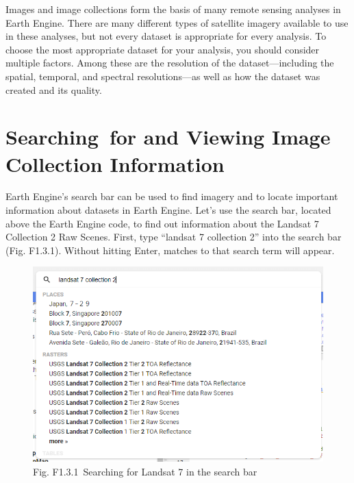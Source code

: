 \documentclass[
  letterpaper,
  DIV=11,
  numbers=noendperiod]{scrreprt}
\begin{document}

Images and image collections form the basis of many remote sensing
analyses in Earth Engine. There are many different types of satellite
imagery available to use in these analyses, but not every dataset is
appropriate for every analysis. To choose the most appropriate dataset
for your analysis, you should consider multiple factors. Among these are
the resolution of the dataset---including the spatial, temporal, and
spectral resolutions---as well as how the dataset was created and its
quality.

\hypertarget{searching-for-and-viewing-image-collection-information}{%
\section{Searching~for and Viewing Image Collection
Information}\label{searching-for-and-viewing-image-collection-information}}

Earth Engine's search bar can be used to find imagery and to locate
important information about datasets in Earth Engine. Let's use the
search bar, located above the Earth Engine code, to find out information
about the Landsat 7 Collection 2 Raw Scenes. First, type ``landsat 7
collection 2'' into the search bar (Fig. F1.3.1). Without hitting Enter,
matches to that search term will appear.

\begin{figure}

{\centering \includegraphics{./F1/image67.png}

}

\caption{Fig. F1.3.1~Searching for Landsat 7 in the search bar}

\end{figure}
\end{document}
